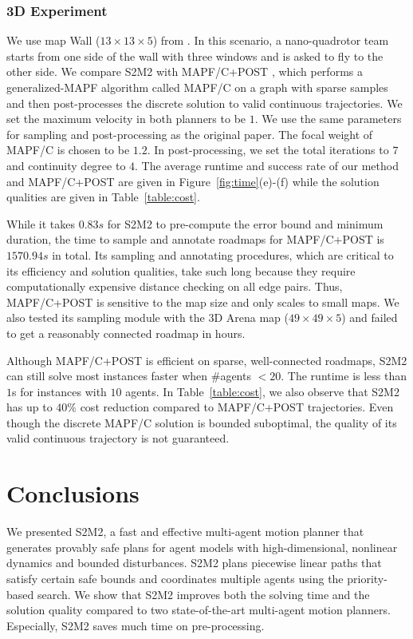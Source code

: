 \documentclass[letterpaper]{article} %
\theoremstyle{definition}
\begin{document}

\subsubsection{3D Experiment}
We use map Wall ($13 \times 13 \times 5$) from \cite{honig2018trajectory}.  In this scenario, a nano-quadrotor team \cite{preiss2017crazyswarm} starts from one side of the wall with three windows and is asked to fly to the other side. We compare S2M2 with MAPF/C+POST \cite{honig2018trajectory}, which performs a generalized-MAPF algorithm called MAPF/C on a graph with sparse samples and then post-processes the discrete solution to valid continuous trajectories. We set the maximum velocity in both planners to be $1$. We use the same parameters for sampling and post-processing as the original paper. The focal weight of MAPF/C is chosen to be $1.2$. In post-processing, we set the total iterations to $7$ and continuity degree to $4$. The average runtime and success rate of our method and MAPF/C+POST are given in Figure~\ref{fig:time}(e)-(f) while the solution qualities are given in Table~\ref{table:cost}.

While it takes $0.83s$ for S2M2 to pre-compute the error bound and minimum duration, the time to sample and annotate roadmaps for MAPF/C+POST is $1570.94s$ in total. Its sampling and annotating procedures, which are critical to its efficiency and solution qualities, take such long because they require computationally expensive distance checking on all edge pairs. Thus, MAPF/C+POST is sensitive to the map size and only scales to small maps. We also tested its sampling module with the 3D Arena map ($49 \times 49 \times 5$) and failed to get a reasonably connected roadmap in hours. 


Although MAPF/C+POST is efficient on sparse, well-connected roadmaps, S2M2 can still solve most instances faster when \#agents $<20$. The runtime is less than $1$s for instances with $10$ agents. In Table~\ref{table:cost}, we also observe that S2M2 has up to $40\%$ cost reduction compared to MAPF/C+POST trajectories. Even though the discrete MAPF/C solution is bounded suboptimal, %
the quality of its valid continuous trajectory is not guaranteed.

\section{Conclusions}
We presented S2M2, a fast and effective multi-agent motion planner that generates provably safe plans for agent models with high-dimensional, nonlinear dynamics and bounded disturbances. S2M2 plans piecewise linear paths that satisfy certain safe bounds and coordinates multiple agents using the priority-based search. We show that S2M2 improves both the solving time and the solution quality compared to two state-of-the-art multi-agent motion planners. Especially, S2M2 saves much time on pre-processing.
\end{document}
